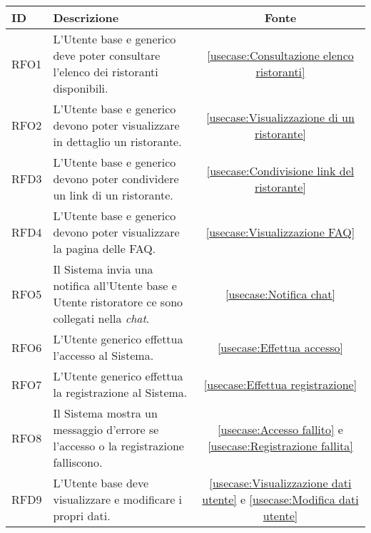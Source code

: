 \begin{table}[H]
	\renewcommand{\arraystretch}{1.5}
	\centering
	\begin{tabularx}{\textwidth}{l|X|c}
		\textbf{ID} & \textbf{Descrizione}                                                                                      & \textbf{Fonte}                                                                         \\
		\hline
		RFO1        & L'Utente base e generico deve poter consultare l'elenco dei ristoranti disponibili.                       & \autoref{usecase:Consultazione elenco ristoranti}                                      \\
		\hline
		RFO2        & L'Utente base e generico devono poter visualizzare in dettaglio un ristorante.                            & \autoref{usecase:Visualizzazione di un ristorante}                                     \\
		\hline
		RFD3        & L'Utente base e generico devono poter condividere un link di un ristorante.                               & \autoref{usecase:Condivisione link del ristorante}                                     \\
		\hline
		RFD4        & L'Utente base e generico devono poter visualizzare la pagina delle FAQ.                                   & \autoref{usecase:Visualizzazione FAQ}                                                  \\
		\hline
		RFO5        & Il Sistema invia una notifica all'Utente base e Utente ristoratore ce sono collegati nella \textit{chat}. & \autoref{usecase:Notifica chat}                                                        \\
		\hline
		RFO6        & L'Utente generico effettua l'accesso al Sistema.                                                          & \autoref{usecase:Effettua accesso}                                                     \\
		\hline
		RFO7        & L'Utente generico effettua la registrazione al Sistema.                                                   & \autoref{usecase:Effettua registrazione}                                               \\
		\hline
		RFO8        & Il Sistema mostra un messaggio d'errore se l'accesso o la registrazione falliscono.                       & \autoref{usecase:Accesso fallito} e \autoref{usecase:Registrazione fallita}            \\
		\hline
		RFD9        & L'Utente base deve visualizzare e modificare i propri dati.                                               & \autoref{usecase:Visualizzazione dati utente} e \autoref{usecase:Modifica dati utente} \\

\end{tabularx}
\end{table}
